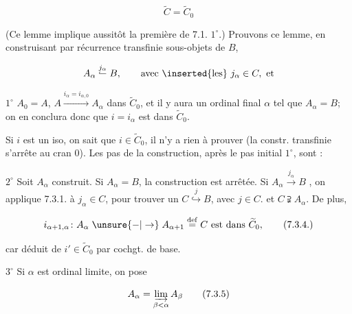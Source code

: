 

\[
\widetilde C=\widetilde C_0\tag*{(7.3.3)}
\]

(Ce lemme implique aussitôt la première  de 7.1. $1^\circ$.) Prouvons ce lemme,   en construisant par récurrence transfinie    sous-objets de $B$,

\[
A_\alpha\overset{j_\alpha}{\lhook\joinrel\relbar} B,\qquad \text{avec \inserted{les} }j_\alpha\in C,\ \text{et}
\]

  \textcircled{$1^\circ$} $A_0=A$,   $A\xrightarrow{i_\alpha=i_{\alpha,0}}A_\alpha$ dans $\widetilde C_0$,  et  il y aura un ordinal final $\alpha$ tel que $A_\alpha=B$;  on en conclura donc que $i=i_\alpha$ est dans $\widetilde C_0$.

Si $i$ est un iso, on sait que $i\in\widetilde C_0$, il  n'y a rien à prouver (la constr. transfinie s'arrête au cran 0). Les   pas de la construction, après le pas initial $1^\circ$, sont :

\textcircled{$2^\circ$} Soit $A_\alpha$ construit. Si $A_\alpha=B$, la construction est arrêtée. Si $A_\alpha\xrightarrow{j_\alpha} B$ , on applique 7.3.1. à $j_\alpha\in C$, pour trouver un \deleted{\unsure{$-$}} $C\overset{j}{\hookrightarrow}B$, avec $j\in C$. et $C\supsetneqq A_\alpha$. De plus,

\[
i_{\alpha+1,\alpha}\colon A_\alpha\mathrel{\unsure{-|\to}} A_{\alpha+1}\overset{\mathrm{def}}=C\ \text{est dans }\widetilde C_0,\tag*{(7.3.4.)}
\]

car déduit de $i'\in\widetilde C_0$ par cochgt. de base.

\textcircled{$3^\circ$} Si $\alpha$ est ordinal limite, on pose

\[
A_\alpha=\varinjlim_{\beta<\alpha} A_\beta\tag*{(7.3.5)}
\]

